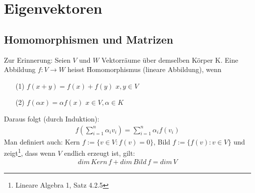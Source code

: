 \chapter{Eigenvektoren} %
\section{Homomorphismen und Matrizen} %
Zur Erinnerung: Seien $V$ und $W$ Vektorräume über demselben Körper K. Eine Abbildung $f: V \rightarrow W$ heisst \f{Homomorphismus} (lineare Abbildung), wenn
\begin{itemize}
\item[(1)] $f(x + y) = f(x) + f(y)$ $x, y \in V$
\item[(2)] $f(\alpha x) = \alpha f(x)$ $x \in V, \alpha \in K$
\end{itemize}
Daraus folgt (durch Induktion):
\begin{align}
f \left( \sum_{i=1}^{n} \alpha_i v_i\right) = \sum_{i=1}^{n} \alpha_i f(v_i)
\end{align}
Man definiert auch: Kern $f := \{v \in V: f(v) = 0\}$, Bild $f:= \{f(v): v \in V\}$ und zeigt\footnote{Lineare Algebra 1, Satz 4.2.5}, dass wenn $V$ endlich erzeugt ist, gilt: 
\begin{align}
dim\, Kern\, f + dim\, Bild\, f = dim\, V
\end{align}

